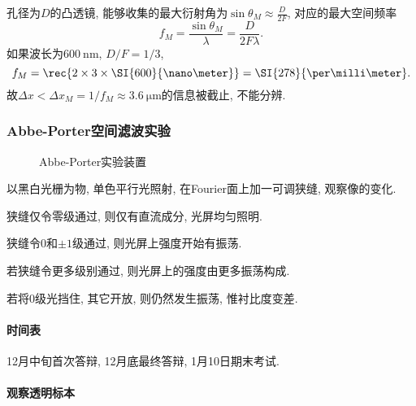 \documentclass{ctexart}
\begin{document}
\begin{sample}
    \begin{ex}
        孔径为$D$的凸透镜, 能够收集的最大衍射角为$\displaystyle \sin\theta_M \approx \frac{D}{2F}$, 对应的最大空间频率
        \[ f_M = \frac{\sin\theta_M}{\lambda} = \frac{D}{2F\lambda}. \]
        如果波长为$\SI{600}{\nano\meter}$, $D/F = 1/3$,
        \[ f_M = \rec{2\times 3 \times \SI{600}{\nano\meter}} = \SI{278}{\per\milli\meter}. \]
        故$\Delta x < \Delta x_M = 1/f_M \approx \SI{3.6}{\micro\meter}$的信息被截止, 不能分辨.
    \end{ex}
\end{sample}


\subsubsection{Abbe-Porter空间滤波实验} %
\label{ssub:abbe_porter空间滤波实验}

\begin{figure}[ht]
    \centering
    \caption{Abbe-Porter实验装置}
\end{figure}
以黑白光栅为物, 单色平行光照射, 在Fourier面上加一可调狭缝, 观察像的变化.
\begin{cenum}
    \item 狭缝仅令零级通过, 则仅有直流成分, 光屏均匀照明.
    \item 狭缝令$0$和$\pm1$级通过, 则光屏上强度开始有振荡.
    \item 若狭缝令更多级别通过, 则光屏上的强度由更多振荡构成.
    \item 若将$0$级光挡住, 其它开放, 则仍然发生振荡, 惟衬比度变差.
\end{cenum}


\paragraph{时间表} %
\label{par:时间表}

12月中旬首次答辩, 12月底最终答辩, 1月10日期末考试.


\paragraph{观察透明标本} %
\label{par:观察透明标本}
\end{document}
